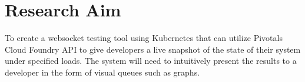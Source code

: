 \chapter{Research Aim}
To create a websocket testing tool using Kubernetes that can utilize Pivotals Cloud Foundry API to give developers a live snapshot of the state of their system under specified loads. The system will need to intuitively present the results to a developer in the form of visual queues such as graphs.